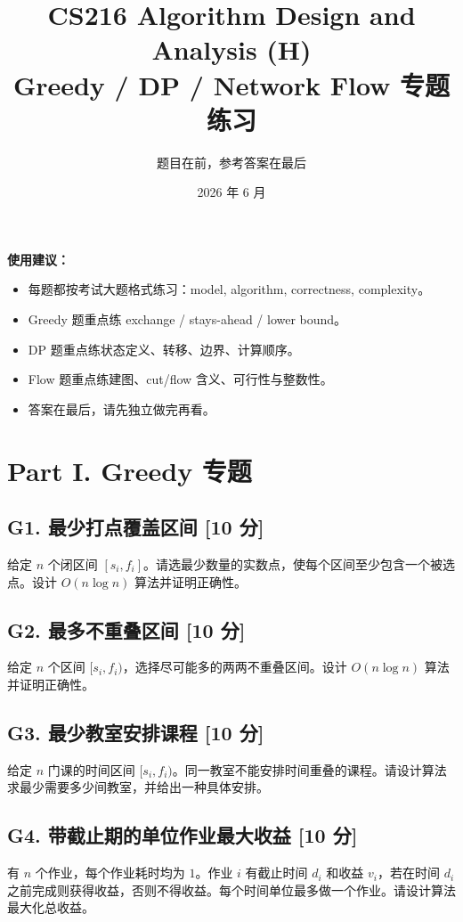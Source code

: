 \documentclass[UTF8,a4paper,11pt]{ctexart}
\title{\textbf{CS216 Algorithm Design and Analysis (H)\\Greedy / DP / Network Flow 专题练习}}
\author{题目在前，参考答案在最后}
\date{2026 年 6 月}
\newcommand{\points}[1]{\hfill{\small\textbf{[#1 分]}}}
\begin{document}
\maketitle

\textbf{使用建议：}
\begin{itemize}
  \item 每题都按考试大题格式练习：model, algorithm, correctness, complexity。
  \item Greedy 题重点练 exchange / stays-ahead / lower bound。
  \item DP 题重点练状态定义、转移、边界、计算顺序。
  \item Flow 题重点练建图、cut/flow 含义、可行性与整数性。
  \item 答案在最后，请先独立做完再看。
\end{itemize}

\section*{Part I. Greedy 专题}

\subsection*{G1. 最少打点覆盖区间 \points{10}}

给定 $n$ 个闭区间 $[s_i,f_i]$。请选最少数量的实数点，使每个区间至少包含一个被选点。设计 $O(n\log n)$ 算法并证明正确性。

\subsection*{G2. 最多不重叠区间 \points{10}}

给定 $n$ 个区间 $[s_i,f_i)$，选择尽可能多的两两不重叠区间。设计 $O(n\log n)$ 算法并证明正确性。

\subsection*{G3. 最少教室安排课程 \points{10}}

给定 $n$ 门课的时间区间 $[s_i,f_i)$。同一教室不能安排时间重叠的课程。请设计算法求最少需要多少间教室，并给出一种具体安排。

\subsection*{G4. 带截止期的单位作业最大收益 \points{10}}

有 $n$ 个作业，每个作业耗时均为 $1$。作业 $i$ 有截止时间 $d_i$ 和收益 $v_i$，若在时间 $d_i$ 之前完成则获得收益，否则不得收益。每个时间单位最多做一个作业。请设计算法最大化总收益。
\end{document}
